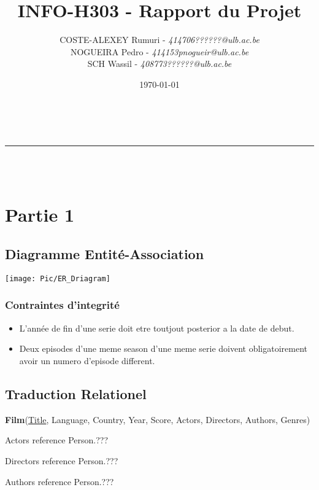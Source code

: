 \documentclass[12pt,a4paper]{article}
\makeatletter
\newcommand{\linha}{\rule{\linewidth}{0.4mm}}
\renewcommand{\maketitle}{
\begin{center}
\vspace{2ex}
{\huge\textsc{\@title}}
\vspace{1ex}\\
\linha\\
\@author\\\@date
\vspace{4ex}
\end{center}
}
\makeatother
\begin{document}
	\title{INFO-H303 - Rapport du Projet}
	\author{
		COSTE-ALEXEY Rumuri - \emph{414706}\hfill\textit{??????@ulb.ac.be}\\
		NOGUEIRA Pedro - \emph{414153}\hfill\textit{pnogueir@ulb.ac.be}\\
		SCH Wassil - \emph{408773}\hfill\textit{??????@ulb.ac.be}
	}
	\date{\today}
	\maketitle



	\section*{Partie 1}

		\subsection*{Diagramme Entité-Association}
			\begin{center}
				\texttt{[image: Pic/ER\_Driagram]}
			\end{center}

			\subsubsection*{Contraintes d'integrité}
				\begin{itemize}
					\item L'année de fin d'une serie doit etre toutjout posterior a la date de debut.
					\item Deux episodes d'une meme season d'une meme serie doivent obligatoirement avoir un numero d'episode different.
				\end{itemize}



		\pagebreak
		\subsection*{Traduction Relationel}

			\textbf{Film}(\underline{Title}, Language, Country, Year, Score, Actors, Directors, Authors, Genres)\par
				\hspace{4ex} Actors reference Person.???\par
				\hspace{4ex} Directors reference Person.???\par
				\hspace{4ex} Authors reference Person.???\\\par
\end{document}
